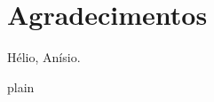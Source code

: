 \documentclass[10pt,twocolumn]{article}
\begin{document}
%
%
%
%
%

\section{Agradecimentos}

Hélio, Anísio.



 {plain}

\end{document}

